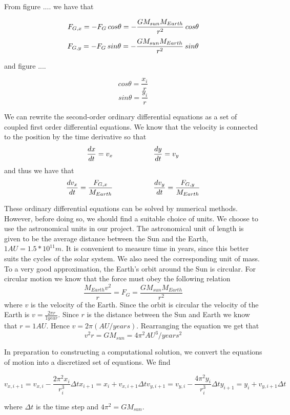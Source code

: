 \documentclass[a4paper,12pt, english]{article}
\begin{document}
From figure .... we have that

$$F_{G,x} = - F_G  \hspace{0.7 mm} cos \theta = - \frac{GM_{sun}M_{Earth}}{r^2} \hspace{0.7 mm} cos \theta $$
$$F_{G,y} = - F_G \hspace{0.7 mm} sin \theta = - \frac{GM_{sun}M_{Earth}}{r^2} \hspace{0.7 mm} sin \theta $$

and figure ....

$$ cos \theta = \frac{x_i}{r} $$
$$ sin \theta = \frac{y_i}{r} $$

We can rewrite the second-order ordinary differential equations as a set of coupled first order differential equations. 
We know that the velocity is connected to the position by the time derivative so that
$$ \frac{dx}{dt} = v_x \hspace{20 mm} \frac{dy}{dt} = v_y$$
and thus we have that
$$ \frac{dv_x}{dt} = \frac{F_{G,x}}{M_{Earth}} \hspace{20 mm} \frac{dv_y}{dt} = \frac{F_{G,y}}{M_{Earth}} $$

These ordinary differential equations can be solved by numerical methods. However, before doing so, we should find a suitable choice of units. We choose to use the astronomical units in our project. The astronomical unit of length is given to be the average distance between the Sun and the Earth, $1 AU = 1.5*10^{11} m$. It is convenient to measure time in years, since this better suits the cycles of the solar system. 
We also need the corresponding unit of mass. To a very good approximation, the Earth's orbit around the Sun is circular. For circular motion we know that the force must obey the following relation 
$$\frac{M_{Earth}v^2}{r} = F_G = \frac{GM_{sun}M_{Earth}}{r^2}$$ where $v$ is the velocity of the Earth. 
Since the orbit is circular the velocity of the Earth is $v = \frac{2 \pi r}{1 year}$. Since $r$ is the distance between the Sun and Earth we know that $r = 1 AU$. Hence $v = 2 \pi (AU/years)$. Rearranging the      equation we get that
$$v^2r = GM_{sun} = 4 \pi ^2 AU^3/years^2$$

In preparation to constructing a computational solution, we convert the equations of motion into a discretized set of equations. We find

\begin{center}
\begin{equation}
v_{x,i+1} = v_{x,i} - \frac{2 \pi ^2 x_i}{r_i ^3} \Delta t 
x_{i+1} = x_i + v_{x,i+1} \Delta t 
v_{y,i+1} = v_{y,i} - \frac{4 \pi ^2 y_i}{r_i ^3} \Delta t 
y_{i+1} = y_i + v_{y,i+1} \Delta t 
\end{equation}
\end{center}

where $\Delta t$ is the time step and $4 \pi ^2 = GM_{sun}$.
\end{document}
